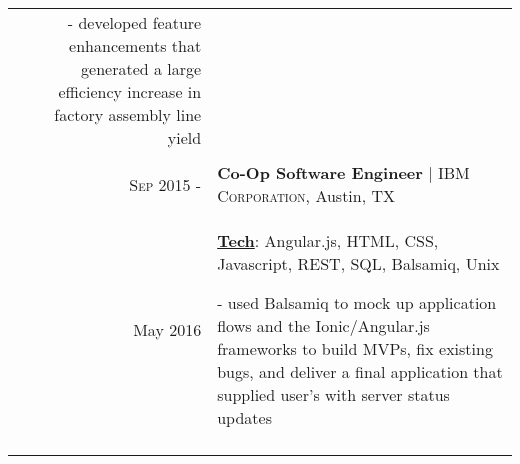\documentclass[a4paper,10pt]{article}
\begin{document}
\begin{tabular}{r|p{12cm}}
{	- developed feature enhancements that generated a large efficiency increase in factory assembly line yield
} \\
 \multicolumn{2}{c}{} \\
 
 \textsc{Sep 2015 -} & \textbf{Co-Op Software Engineer} | \textsc{IBM Corporation}, Austin, TX \\
 May 2016 & \small{
 	\textbf{\underline{Tech}}: Angular.js, HTML, CSS, Javascript, REST, SQL, Balsamiq, Unix}
 
	\tiny{
	\vphantom{a}
	}
	
	\small{
 	- used Balsamiq to mock up application flows and the Ionic/Angular.js frameworks to build MVPs, fix existing bugs, and deliver a final application that supplied user’s with server status updates
 } \\
 \multicolumn{2}{c}{} \\
\end{tabular}
\end{document}
